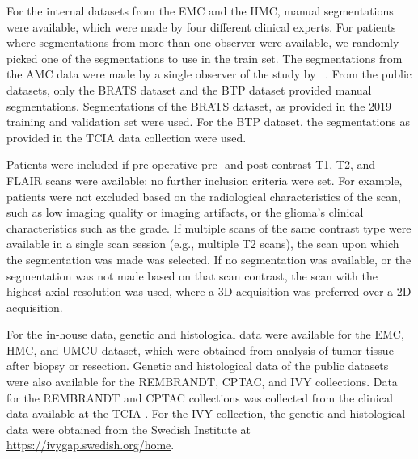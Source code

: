 For the internal datasets from the \gls{EMC} and the \gls{HMC}, manual segmentations were available, which were made by four different clinical experts.
For patients where segmentations from more than one observer were available, we randomly picked one of the segmentations to use in the train set.
The segmentations from the \gls{AMC} data were made by a single observer of the study by \citeauthor*{visser2019segmentation}~\autocite{visser2019segmentation}.
From the public datasets, only the \gls{BRATS} dataset and the \gls{BTP} dataset provided manual segmentations.
Segmentations of the \gls{BRATS} dataset, as provided in the 2019 training and validation set were used.
For the \gls{BTP} dataset, the segmentations as provided in the \gls{TCIA} data collection were used.

Patients were included if pre-operative pre- and post-contrast \gls{T1}, \gls{T2}, and \gls{FLAIR} scans were available; no further inclusion criteria were set.
For example, patients were not excluded based on the radiological characteristics of the scan, such as low imaging quality or imaging artifacts, or the glioma's clinical characteristics such as the grade.
If multiple scans of the same contrast type were available in a single scan session (e.g., multiple \gls{T2} scans), the scan upon which the segmentation was made was selected.
If no segmentation was available, or the segmentation was not made based on that scan contrast, the scan with the highest axial resolution was used, where a 3D acquisition was preferred over a 2D acquisition.

For the in-house data, genetic and histological data were available for the \gls{EMC}, \gls{HMC}, and \gls{UMCU} dataset, which were obtained from analysis of tumor tissue after biopsy or resection.
Genetic and histological data of the public datasets were also available for the \gls{REMBRANDT}, \gls{CPTAC}, and \gls{IVY} collections.
Data for the \gls{REMBRANDT} and  \gls{CPTAC} collections was collected from the clinical data available at the \gls{TCIA} \autocite{cptac2018radiology,scarpace2015radiology}.
For the \gls{IVY} collection, the genetic and histological data were obtained from the Swedish Institute at \url{https://ivygap.swedish.org/home}.

